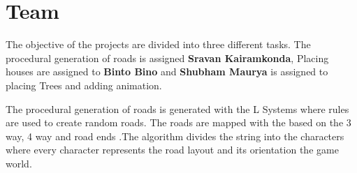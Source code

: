 \chapter{Team}

\large The objective of the projects are divided into three different tasks. The procedural generation of roads is assigned \textbf{Sravan Kairamkonda}, Placing houses are assigned to \textbf{Binto Bino} and  \textbf{Shubham Maurya} is assigned to placing Trees and adding animation.

\vspace{0.5cm}

\large The procedural generation of roads is generated with the L Systems where rules are used to create random roads. The roads are mapped with the based on the 3 way, 4 way and road ends \cite{galin2010procedural}.The algorithm divides the string into the characters where every character represents the road layout and its orientation the game world.